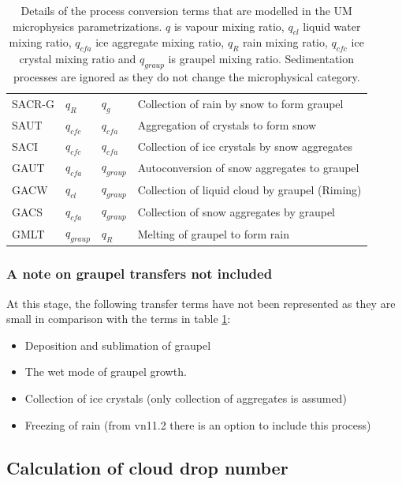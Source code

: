 \documentclass{UMDP_article}
\begin{document}
\begin{table}[ht!]
\begin{center}
\begin{tabular}{|l|l|l|l|}
SACR-G & $q_R$ & $q_{g}$ &
Collection of rain by snow to form graupel \\
SAUT & $q_{cfc}$ & $q_{cfa}$ &
Aggregation of crystals to form snow \\
SACI & $q_{cfc}$ & $q_{cfa}$ & 
Collection of ice crystals by snow aggregates \\
\hline
GAUT & $q_{cfa}$ & $q_{graup}$ &  
Autoconversion of snow aggregates to graupel\\
GACW & $q_{cl}$ & $q_{graup}$ &
Collection of liquid cloud by graupel (Riming)\\
GACS & $q_{cfa}$ & $q_{graup}$ &
Collection of snow aggregates by graupel\\
GMLT & $q_{graup}$ & $q_{R}$ & 
Melting of graupel to form rain \\
\hline
\end{tabular}
\end{center}
\normalsize
\caption{Details of the process conversion terms that are modelled in the
  UM microphysics parametrizations. $q$ is vapour mixing ratio, $q_{cl}$
  liquid water mixing ratio, $q_{cfa}$ ice aggregate mixing ratio,
  $q_R$ rain mixing ratio, $q_{cfc}$ ice crystal mixing ratio and 
  $q_{graup}$ is graupel mixing ratio. Sedimentation processes are ignored
  as they do not change the microphysical category.}
\label{tab:rates}
\end{table}
\newpage
\subsubsection{A note on graupel transfers not included}
\label{sec:gr_tr}

At this stage, the following transfer terms have not been represented as they
are small in comparison with the terms in table \ref{tab:rates}:
\begin{itemize}
\item Deposition and sublimation of graupel
\item The wet mode of graupel growth. 
\item Collection of  ice crystals 
(only collection of aggregates is assumed)
\item Freezing of rain (from vn11.2 there is an option to include this process)
\end{itemize}

\subsection{Calculation of cloud drop number}
\label{sec:cloud_drop_calc}
\end{document}
